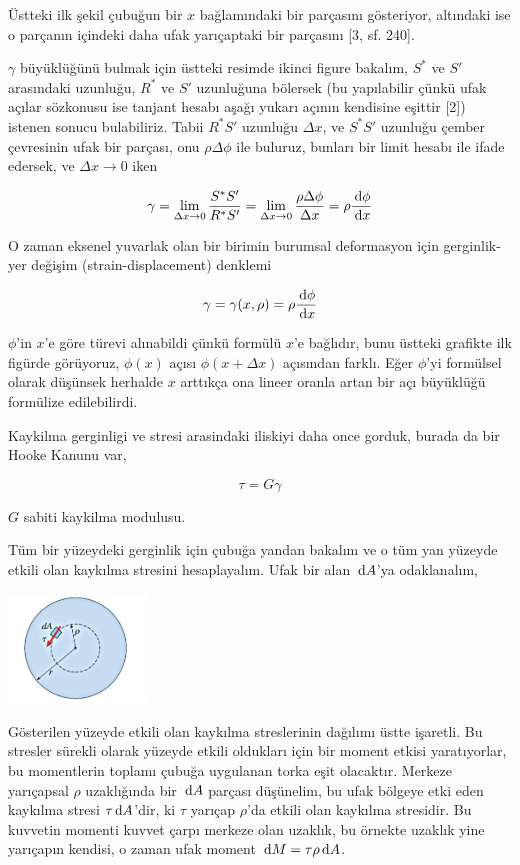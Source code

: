 \documentclass[12pt,fleqn]{article}\usepackage{../../common}
\begin{document}
Üstteki ilk şekil çubuğun bir $x$ bağlamındaki bir parçasını gösteriyor,
altındaki ise o parçanın içindeki daha ufak yarıçaptaki bir parçasını [3, sf. 240]. 

$\gamma$ büyüklüğünü bulmak için üstteki resimde ikinci figure bakalım, $S^*$ ve
$S'$ arasındaki uzunluğu, $R^*$ ve $S'$ uzunluğuna bölersek (bu yapılabilir
çünkü ufak açılar sözkonusu ise tanjant hesabı aşağı yukarı açının kendisine
eşittir [2]) istenen sonucu bulabiliriz. Tabii $R^*S'$ uzunluğu $\Delta x$,
ve $S^*S'$ uzunluğu çember çevresinin ufak bir parçası, onu  $\rho \Delta \phi$
ile buluruz, bunları bir limit hesabı ile ifade edersek, ve $\Delta x \to 0$
iken

$$
\gamma = \lim_{\Delta x \to 0} \frac{S^*S'}{R^*S'} =
\lim_{\Delta x \to 0} \frac{\rho \Delta \phi}{\Delta x} =
\rho \frac{\,\mathrm{d} \phi}{\,\mathrm{d} x}
$$

O zaman eksenel yuvarlak olan bir birimin burumsal deformasyon için
gerginlik-yer değişim (strain-displacement) denklemi

$$
\gamma = \gamma(x,\rho) = \rho \frac{\,\mathrm{d} \phi}{\,\mathrm{d} x}
$$

$\phi$'in $x$'e göre türevi alınabildi çünkü formülü $x$'e bağlıdır, bunu
üstteki grafikte ilk figürde görüyoruz, $\phi(x)$ açısı $\phi(x+\Delta x)$
açısından farklı. Eğer $\phi$'yi formülsel olarak düşünsek herhalde $x$ arttıkça
ona lineer oranla artan bir açı büyüklüğü formülize edilebilirdi.

Kaykilma gerginligi ve stresi arasindaki iliskiyi daha once gorduk, burada da
bir Hooke Kanunu var,

$$
\tau = G \gamma
$$

$G$ sabiti kaykilma modulusu. 

Tüm bir yüzeydeki gerginlik için çubuğa yandan bakalım ve o tüm yan yüzeyde
etkili olan kaykılma stresini hesaplayalım. Ufak bir alan $\,\mathrm{d} A$'ya
odaklanalım,

\includegraphics[width=10em]{phy_020_strs_06_04.jpg}

Gösterilen yüzeyde etkili olan kaykılma streslerinin dağılımı üstte işaretli. Bu
stresler sürekli olarak yüzeyde etkili oldukları için bir moment etkisi
yaratıyorlar, bu momentlerin toplamı çubuğa uygulanan torka eşit
olacaktır. Merkeze yarıçapsal $\rho$ uzaklığında bir $\,\mathrm{d} A$ parçası düşünelim,
bu ufak bölgeye etki eden kaykılma stresi $\tau \,\mathrm{d} A$'dir, ki $\tau$ yarıçap
$\rho$'da etkili olan kaykılma stresidir. Bu kuvvetin momenti kuvvet çarpı
merkeze olan uzaklık, bu örnekte uzaklık yine yarıçapın kendisi, o zaman ufak
moment $\,\mathrm{d} M = \tau \rho \,\mathrm{d} A$.
\end{document}

